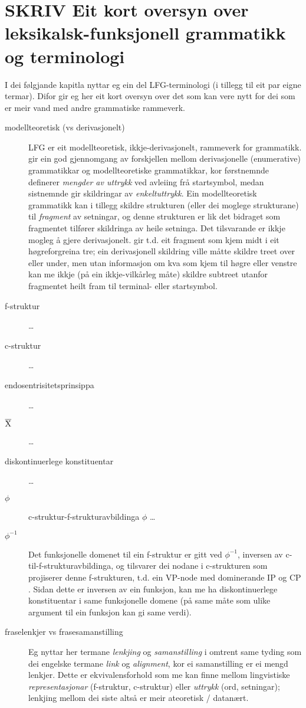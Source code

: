 \documentclass[11pt,a4paper,oneside,draft]{book}
\newcommand{\xbar}{$\rm\overline{X}$}
\begin{document}
\section{\textbf{SKRIV} Eit kort oversyn over leksikalsk-funksjonell grammatikk og terminologi}
\label{sec-2.2}

\label{SEC:omgrepsavklaring}

I dei følgjande kapitla nyttar eg ein del LFG-terminologi (i tillegg
til eit par eigne termar). Difor gir eg her eit kort oversyn over det
som kan vere nytt for dei som er meir vand med andre grammatiske
rammeverk.

\begin{description}
\item [modellteoretisk (vs derivasjonelt)] LFG er eit modellteoretisk,
  ikkje-derivasjonelt, rammeverk for grammatikk.
  \citet{pullum2001dbm} gir ein god gjennomgang av forskjellen mellom
  derivasjonelle (enumerative) grammatikkar og modellteoretiske
  grammatikkar, kor førstnemnde definerer \emph{mengder av uttrykk} ved
  avleiing frå startsymbol, medan sistnemnde gir skildringar av
  \emph{enkeltuttrykk}. Ein modellteoretisk grammatikk kan i tillegg
  skildre strukturen (eller dei moglege strukturane) til \emph{fragment} av
  setningar, og denne strukturen er lik det bidraget som fragmentet
  tilfører skildringa av heile setninga. Det tilsvarande er ikkje
  mogleg å gjere derivasjonelt. \citet[s.~32--33]{pullum2001dbm} gir
  t.d. eit fragment som kjem midt i eit høgreforgreina tre; ein
  derivasjonell skildring ville måtte skildre treet over eller under,
  men utan informasjon om kva som kjem til høgre eller venstre kan me
  ikkje (på ein ikkje-vilkårleg måte) skildre subtreet utanfor
  fragmentet heilt fram til terminal- eller startsymbol.
\item [f-struktur] \ldots{}
\item [c-struktur] \ldots{}
\item [endosentrisitetsprinsippa] \ldots{}
\item [\xbar] \ldots{}
\item [diskontinuerlege konstituentar] \ldots{}
\item [$\phi$] c-struktur-f-strukturavbildinga $\phi$ \ldots{}
\item [$\phi^{-1}$] Det funksjonelle domenet til ein f-struktur er gitt
  ved $\phi^{-1}$, inversen av c-til-f-strukturavbildinga, og
  tilsvarer dei nodane i c-strukturen som projiserer denne
  f-strukturen, t.d. ein VP-node med dominerande IP og CP
  \citep[s.~126]{bresnan2001lfs}. Sidan dette er inversen av ein
  funksjon, kan me ha diskontinuerlege konstituentar i same
  funksjonelle domene (på same måte som ulike argument til ein
  funksjon kan gi same verdi).
\item [fraselenkjer vs frasesamanstilling] Eg nyttar her termane
  \emph{lenkjing} og \emph{samanstilling} i omtrent same tyding som dei engelske
  termane \emph{link} og \emph{alignment}, kor ei samanstilling er ei mengd
  lenkjer. Dette er ekvivalensforhold som me kan finne mellom
  lingvistiske \emph{representasjonar} (f-struktur, c-struktur) eller
  \emph{uttrykk} (ord, setningar); lenkjing mellom dei siste altså er meir
  ateoretisk / datanært.
\end{description}
\end{document}
